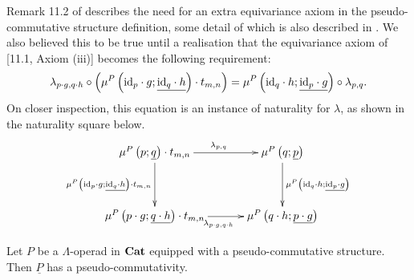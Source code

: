 \begin{remark}
Remark 11.2 of \cite{guillou_multiplicative} describes the need for an extra equivariance axiom in the pseudo-commutative structure definition, some detail of which is also described in \cite{guillou_symmetric}. We also believed this to be true until a realisation that the equivariance axiom of \cite{guillou_multiplicative}[11.1, Axiom (iii)] becomes the following requirement:
          \[
            \lambda_{p \cdot g, q \cdot h} \circ \left(\mu^P\left(\textrm{id}_p \cdot g; \underline{\textrm{id}_q \cdot h}\right) \cdot t_{m,n}\right) = \mu^P\left(\textrm{id}_q \cdot h; \underline{\textrm{id}_p \cdot g}\right) \circ \lambda_{p,q}.
          \]
On closer inspection, this equation is an instance of naturality for $\lambda$, as shown in the naturality square below.
          \[
            \xy
              (-20,10)*+{\mu^P\left(p;\underline{q}\right) \cdot t_{m,n}}="a";
              (20,10)*+{\mu^P\left(q;\underline{p}\right)}="b";
              (-20,-10)*+{\mu^P\left(p \cdot g; \underline{q \cdot h}\right) \cdot t_{m,n}}="c";
              (20,-10)*+{\mu^P\left(q \cdot h; \underline{p \cdot g}\right)}="d";
              {\ar^{\lambda_{p,q}} "a" ; "b"};
              {\ar^{\mu^P\left(\id_q \cdot h; \underline{\id_p \cdot g}\right)} "b" ; "d"};
              {\ar_{\mu^P\left(\id_p \cdot g; \underline{\id_q \cdot h}\right) \cdot t_{m,n}} "a" ; "c"};
              {\ar_{\lambda_{p \cdot g, q \cdot h}} "c" ; "d"};
            \endxy
          \]
\end{remark}

\begin{thm}\label{thm:pscomm}
Let $P$ be a $\Lambda$-operad in $\mathbf{Cat}$ equipped with a pseudo-commutative structure. Then $\underline{P}$ has a pseudo-commutativity.
\end{thm}

